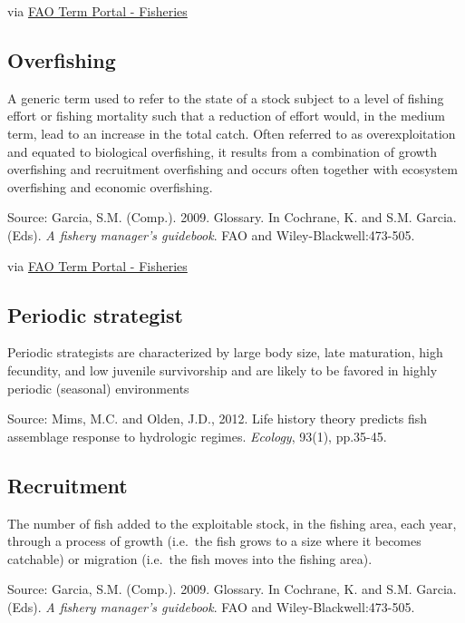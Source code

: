 \documentclass[
  11pt,
]{book}
\begin{document}
via \href{http://www.fao.org/fishery/glossary/en}{FAO Term Portal - Fisheries}

\hypertarget{overfishing}{%
\subsection{Overfishing}\label{overfishing}}

A generic term used to refer to the state of a stock subject to a level of fishing effort or fishing mortality such that a reduction of effort would, in the medium term, lead to an increase in the total catch. Often referred to as overexploitation and equated to biological overfishing, it results from a combination of growth overfishing and recruitment overfishing and occurs often together with ecosystem overfishing and economic overfishing.

Source: Garcia, S.M. (Comp.). 2009. Glossary. In Cochrane, K. and S.M. Garcia. (Eds). \emph{A fishery manager's guidebook}. FAO and Wiley-Blackwell:473-505.

via \href{http://www.fao.org/fishery/glossary/en}{FAO Term Portal - Fisheries}

\hypertarget{periodic-strategist}{%
\subsection{Periodic strategist}\label{periodic-strategist}}

Periodic strategists are characterized by large body size, late maturation, high fecundity, and low juvenile survivorship and are likely to be favored in highly periodic (seasonal) environments

Source: Mims, M.C. and Olden, J.D., 2012. Life history theory predicts fish assemblage response to hydrologic regimes. \emph{Ecology}, 93(1), pp.35-45.

\hypertarget{recruitment}{%
\subsection{Recruitment}\label{recruitment}}

The number of fish added to the exploitable stock, in the fishing area, each year, through a process of growth (i.e.~the fish grows to a size where it becomes catchable) or migration (i.e.~the fish moves into the fishing area).

Source: Garcia, S.M. (Comp.). 2009. Glossary. In Cochrane, K. and S.M. Garcia. (Eds). \emph{A fishery manager's guidebook}. FAO and Wiley-Blackwell:473-505.
\end{document}
